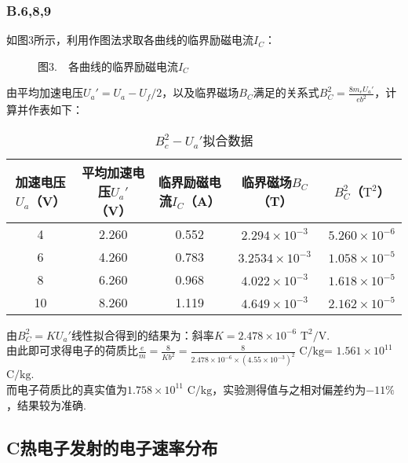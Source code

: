 \documentclass{ctexart}
\begin{document}
\subsubsection*{B.6,8,9}
\noindent 如图3所示，利用作图法求取各曲线的临界励磁电流$I_C$：
\clearpage
\begin{figure}[H]
  \centering
   \quad
   \quad
   \quad
   \caption*{图$3.\quad$各曲线的临界励磁电流$I_C$}
  \end{figure}
\noindent 由平均加速电压$U_a'=U_a-U_f/2$，以及临界磁场$B_C$满足的关系式$\displaystyle B_C^2=\frac{8m_eU_a'}{eb^2}$，计算并作表如下：
\setcounter{table}{2} %
\begin{table}[H]
  \centering
  \caption{$B_c^2-U_a'$拟合数据}\vspace{0.3em} 
  \begin{tabular}{ccccc}
  \toprule
  加速电压$U_a$（V）& 平均加速电压$U_a'$（V）& 临界励磁电流$I_C$（A）& 临界磁场$B_C$（T）& $B_C^2$（$\mathrm{T^2}$） \\
  \midrule
  4& 2.260& 0.552& $2.294\times 10^{-3}$& $5.260\times 10^{-6}$\\
  6& 4.260& 0.783& $3.2534\times 10^{-3}$& $1.058\times 10^{-5}$\\
  8& 6.260& 0.968& $4.022\times 10^{-3}$& $1.618\times 10^{-5}$\\
  10& 8.260& 1.119& $4.649\times 10^{-3}$& $2.162\times 10^{-5}$\\
  \bottomrule
  \end{tabular}
  \end{table}
\noindent 由$B_C^2=KU_a'$线性拟合得到的结果为：斜率$K=2.478\times 10^{-6}$  $\mathrm{T^2/V}$.\\

\noindent 由此即可求得电子的荷质比$\displaystyle\frac{e}{m}=\frac{8}{Kb^2}=\frac{8}{2.478\times 10^{-6}\times (4.55\times 10^{-3})^2}$  $\mathrm{C/kg}$= $1.561\times 10^{11}$  $\mathrm{C/kg}$.\\

\noindent 而电子荷质比的真实值为$1.758\times 10^{11}$  $\mathrm{C/kg}$，实验测得值与之相对偏差约为$ -11\%$，结果较为准确.
\subsection*{C\quad 热电子发射的电子速率分布}
\end{document}
